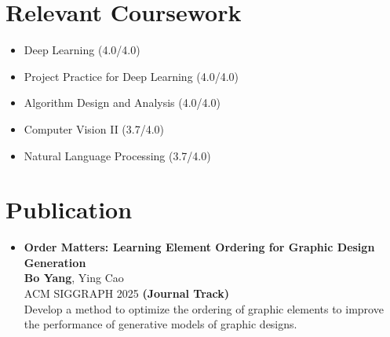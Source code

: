 \documentclass[letterpaper,11pt]{article}
\newcommand{\resumeItem}[1]{
  \item\small{
    {#1 \vspace{-2pt}}
  }
}
\newcommand{\resumeSubHeadingListStart}{\begin{itemize}[leftmargin=0.0in, label={}]}
\newcommand{\resumeSubHeadingListEnd}{\end{itemize}}
\newcommand{\resumeItemListStart}{\begin{itemize}}
\newcommand{\resumeItemListEnd}{\end{itemize}\vspace{-5pt}}
\begin{document}
\section{Relevant Coursework}
        \begin{multicols}{2}
            \begin{itemize}[itemsep=-3pt, parsep=3pt]
                \item\small Deep Learning (4.0/4.0)
                \item\small Project Practice for Deep Learning (4.0/4.0)
                \item Algorithm Design and Analysis (4.0/4.0)
                \item Computer Vision II (3.7/4.0)
                \item Natural Language Processing (3.7/4.0)
                
            \end{itemize}
        \end{multicols}
        \vspace{-2pt}

\section{Publication}
    \resumeItemListStart
      \resumeItem{\textbf{Order Matters: Learning Element Ordering for Graphic Design Generation} \\
      \vspace{2pt}
      \textbf{Bo Yang}, Ying Cao \\
      \vspace{2pt}
      ACM SIGGRAPH 2025 \textbf{(Journal Track)} \\
      \vspace{2pt}
      Develop a method to optimize the ordering of graphic elements to improve the performance of generative models of graphic designs.
      
      }
    \resumeItemListEnd
    
\vspace{-6pt}

\end{document}
